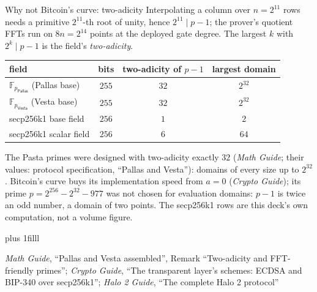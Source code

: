 \documentclass[aspectratio=169,11pt]{beamer}
\newcommand{\F}{\mathbb{F}}
\newcommand{\Pallas}{\ensuremath{\mathsf{Pallas}}}
\newcommand{\Vesta}{\ensuremath{\mathsf{Vesta}}}
\newcommand{\Fpp}{\ensuremath{\F_{p_{\Pallas}}}}
\newcommand{\Fpv}{\ensuremath{\F_{p_{\Vesta}}}}
\newcommand{\src}[1]{\par\vskip0pt plus 1filll
  {\fontsize{6}{7.2}\selectfont\color{arbdim}\raggedright #1\par}}
\begin{document}
\begin{frame}{Why not Bitcoin's curve: two-adicity}
Interpolating a column over $n = 2^{11}$ rows needs a primitive
$2^{11}$-th root of unity, hence $2^{11} \mid p - 1$; the prover's
quotient FFTs run on $8n = 2^{14}$ points at the deployed gate degree.
The largest $k$ with $2^k \mid p - 1$ is the field's \emph{two-adicity}.
{\centering\small
\begin{tabular}{@{}lccc@{}}
\toprule
field & bits & two-adicity of $p - 1$ & largest domain \\
\midrule
$\Fpp$ (Pallas base) & $255$ & $32$ & $2^{32}$ \\
$\Fpv$ (Vesta base) & $255$ & $32$ & $2^{32}$ \\
secp256k1 base field & $256$ & $1$ & $2$ \\
secp256k1 scalar field & $256$ & $6$ & $64$ \\
\bottomrule
\end{tabular}\par}
\smallskip
The Pasta primes were designed with two-adicity exactly $32$
(\emph{Math Guide}; their values: protocol specification, ``Pallas and
Vesta''): domains of every size up to $2^{32}$. Bitcoin's curve buys its
implementation speed from $a = 0$ (\emph{Crypto Guide}); its prime
$p = 2^{256} - 2^{32} - 977$ was not chosen for evaluation domains:
$p - 1$ is twice an odd number, a domain of two points. The secp256k1
rows are this deck's own computation, not a volume figure.
\src{\emph{Math Guide}, ``Pallas and Vesta assembled'', Remark
``Two-adicity and FFT-friendly primes''; \emph{Crypto Guide}, ``The
transparent layer's schemes: ECDSA and BIP-340 over secp256k1'';
\emph{Halo 2 Guide}, ``The complete Halo 2 protocol''}
\end{frame}
\end{document}
